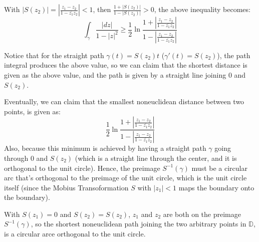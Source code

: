\documentclass{article}
\begin{document}
With $|S(z_2)| = \left|\frac{z_1-z_2}{1-\bar{z_1}z_2}\right| <1$, then $\frac{1+|S(z_2)|}{1-|S(z_2)|}>0$, the above inequality becomes:
$$\int_{\gamma}\frac{|dz|}{1-|z|^2}\geq \frac{1}{2}\ln\frac{1+\left|\frac{z_1-z_2}{1-\bar{z_1}z_2}\right|}{1-\left|\frac{z_1-z_2}{1-\bar{z_1}z_2}\right|}$$

Notice that for the straight path $\gamma(t)=S(z_2)t$ ($\gamma'(t)=S(z_2)$), the path integral produces the above value,
so we can claim that the shortest distance is given as the above value, and the path is given by a straight line joining $0$ and $S(z_2)$.

\hfill

Eventually, we can claim that the smallest noneuclidean distance between two points, is given as:
$$\frac{1}{2}\ln\frac{1+\left|\frac{z_1-z_2}{1-\bar{z_1}z_2}\right|}{1-\left|\frac{z_1-z_2}{1-\bar{z_1}z_2}\right|}$$
Also, because this minimum is achieved by having a straight path $\gamma$ going through $0$ and $S(z_2)$ (which is a straight line through the center, and it is orthogonal to the unit circle).
Hence, the preimage $S^{-1}(\gamma)$ must be a circular arc that's orthogonal to the preimage of the unit circle, which is the unit circle itself (since the Mobius Transoformation $S$ with $|z_1|<1$ maps the boundary onto the boundary).

With $S(z_1)=0$ and $S(z_2)=S(z_2)$, $z_1$ and $z_2$ are both on the preimage $S^{-1}(\gamma)$, so the shortest noneuclidean path joining the two arbitrary points in $\mathbb{D}$,
is a circular arce orthogonal to the unit circle.
\end{document}

